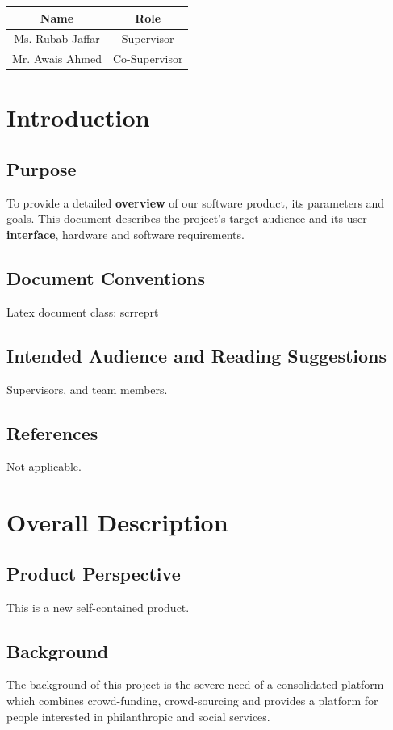 \documentclass{scrreprt}
\begin{document}
\begin{center}
    \begin{tabular}{|c|c|}
        \hline
	    Name & Role\\
        \hline
	    Ms. Rubab Jaffar & Supervisor\\
        \hline
	    Mr. Awais Ahmed & Co-Supervisor\\
        \hline
    \end{tabular}
\end{center}

\chapter{Introduction}

\section{Purpose}
To provide a detailed \textbf{overview} of our software product, its parameters and goals. This document describes the project's target audience and its user \textbf{interface}, hardware and software requirements.

\section{Document Conventions}
Latex document class: scrreprt

\section{Intended Audience and Reading Suggestions}
Supervisors, and team members.

\section{References}
Not applicable.


\chapter{Overall Description}

\section{Product Perspective}
This is a new self-contained product.

\section{Background}
The background of this project is the severe need of a consolidated platform which combines crowd-funding, crowd-sourcing and provides a platform for people interested in philanthropic and social services.
\end{document}
